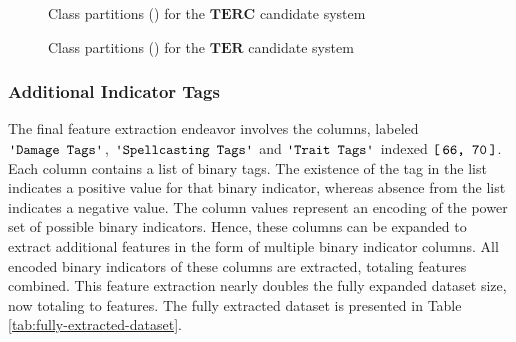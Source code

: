 \documentclass{article}
\newcommand{\Qty}[1]{\oldstylenums{#1}}
\newcommand{\TER}{\ensuremath{\mathbf{TER}}\xspace}
\newcommand{\TERC}{\ensuremath{\mathbf{TERC}}\xspace}
\newcommand{\Column}[1]{\ensuremath{\texttt{\textquotesingle{}#1\textquotesingle{}}}\xspace}
\newcommand{\IndexRange}[2]{\ensuremath{\texttt{{[}\,#1,\ #2\,{]}}}\xspace}
\begin{document}
\begin{figure}[htb]
	\centering
	\caption{Class partitions (\Qty{12}) for the \TERC candidate system}\label{fig:Partitions-TERC}
\end{figure}

\begin{figure}[htb]
	\centering
	\caption{Class partitions (\Qty{22}) for the \TER candidate system}\label{fig:Partitions-TER}
\end{figure}


\hypertarget{extraction-of-indicator-tags}{
\subsubsection{Additional Indicator Tags}\label{extraction-of-indicator-tags}}

The final feature extraction endeavor involves the columns, labeled \Column{Damage\ Tags}, \Column{Spellcasting\ Tags} and \Column{Trait\ Tags} indexed \IndexRange{66}{70}.
Each column contains a list of binary tags.
The existence of the tag in the list indicates a positive value for that binary indicator, whereas absence from the list indicates a negative value.
The column values represent an encoding of the power set of possible binary indicators.
Hence, these columns can be expanded to extract additional features in the form of multiple binary indicator columns.
All encoded binary indicators of these columns are extracted, totaling \Qty{63} features combined.
This feature extraction nearly doubles the fully expanded dataset size, now totaling to \Qty{136} features.
The fully extracted dataset is presented in Table \ref{tab:fully-extracted-dataset}.
\end{document}
